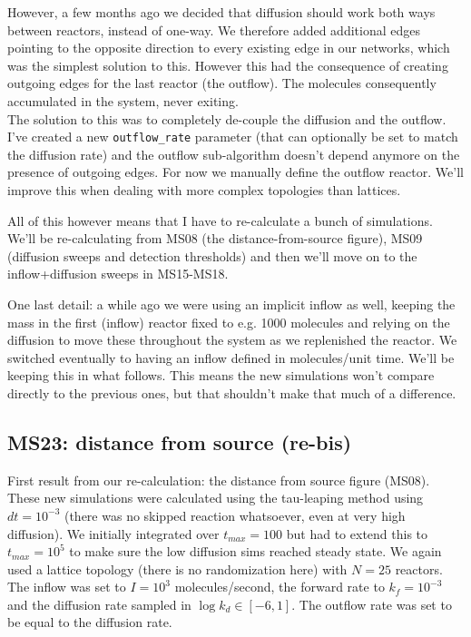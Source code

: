 \documentclass[11pt]{article}
\begin{document}
However, a few months ago we decided that diffusion should work both ways between reactors, instead of one-way. We therefore added additional edges pointing to the opposite direction to every existing edge in our networks, which was the simplest solution to this. However this had the consequence of creating outgoing edges for the last reactor (the outflow). The molecules consequently accumulated in the system, never exiting.\\

The solution to this was to completely de-couple the diffusion and the outflow. I’ve created a new \verb|outflow_rate| parameter (that can optionally be set to match the diffusion rate) and the outflow sub-algorithm doesn’t depend anymore on the presence of outgoing edges. For now we manually define the outflow reactor. We’ll improve this when dealing with more complex topologies than lattices.

All of this however means that I have to re-calculate a bunch of simulations. We’ll be re-calculating from MS08 (the distance-from-source figure), MS09 (diffusion sweeps and detection thresholds) and then we’ll move on to the inflow+diffusion sweeps in MS15-MS18.

One last detail: a while ago we were using an implicit inflow as well, keeping the mass in the first (inflow) reactor fixed to e.g. 1000 molecules and relying on the diffusion to move these throughout the system as we replenished the reactor. We switched eventually to having an inflow defined in molecules/unit time. We’ll be keeping this in what follows. This means the new simulations won’t compare directly to the previous ones, but that shouldn’t make that much of a difference.

\clearpage

\subsection{MS23: distance from source (re-bis)}

First result from our re-calculation: the distance from source figure (MS08). These new simulations were calculated using the tau-leaping method using $dt=10^{-3}$ (there was no skipped reaction whatsoever, even at very high diffusion). We initially integrated over $t_{max}=100$ but had to extend this to $t_{max}=10^5$ to make sure the low diffusion sims reached steady state. We again used a lattice topology (there is no randomization here) with $N=25$ reactors. The inflow was set to $I=10^3$ molecules/second, the forward rate to $k_f=10^{-3}$ and the diffusion rate sampled in $\log k_d \in [-6, 1]$. The outflow rate was set to be equal to the diffusion rate.
\end{document}
